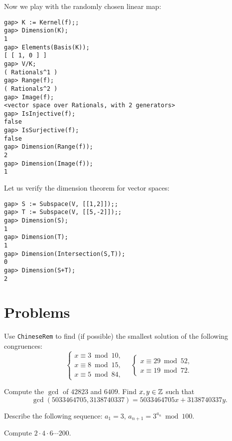 Now we play with the randomly chosen 
linear map:
\begin{lstlisting}
gap> K := Kernel(f);;
gap> Dimension(K);
1
gap> Elements(Basis(K));
[ [ 1, 0 ] ]
gap> V/K;
( Rationals^1 )  
gap> Range(f);
( Rationals^2 )
gap> Image(f);
<vector space over Rationals, with 2 generators>
gap> IsInjective(f);
false
gap> IsSurjective(f);
false
gap> Dimension(Range(f));
2
gap> Dimension(Image(f));
1
\end{lstlisting}

Let us verify the dimension theorem
for vector spaces:
\begin{lstlisting}
gap> S := Subspace(V, [[1,2]]);;
gap> T := Subspace(V, [[5,-2]]);;
gap> Dimension(S);
1
gap> Dimension(T);
1
gap> Dimension(Intersection(S,T));
0
gap> Dimension(S+T);
2
\end{lstlisting}

\section{Problems}

\begin{prob}
	\label{prob:chinese}
	Use \lstinline{ChineseRem} to find (if possible) the smallest solution of
	the following congruences:
	\[
		\begin{cases}
		x\equiv 3\bmod 10,\\
		x\equiv 8\bmod 15,\\
		x\equiv 5\bmod 84,
	\end{cases}
	\quad
	\begin{cases}
		x\equiv 29\bmod 52,\\
		x\equiv 19\bmod 72.
	\end{cases}
	\]
\end{prob}

\begin{prob}
	\label{prob:gcd}
	Compute the $\gcd$ of $42823$ and $6409$. 
	Find $x,y\in\mathbb{Z}$ such that
	\[
	\gcd(5033464705,3138740337)=5033464705x+3138740337y. 
	\]
\end{prob}

\begin{prob}
	\label{prob:sequence}
	Describe the following sequence: $a_1=3$, $a_{n+1}=3^{a_n}\bmod 100$.
\end{prob}

\begin{prob}
	\label{prob:product}
    Compute $2\cdot 4\cdot 6\cdots
    200$. 
\end{prob}

